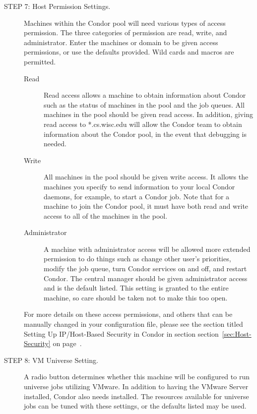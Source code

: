 \begin{description}
\item[STEP 7: Host Permission Settings.]
     Machines within the Condor pool will need various types of 
     access permission. 
     The three categories of permission are read, write, and administrator.
     Enter the machines or domain to be given access permissions,
     or use the defaults provided.
     Wild cards and macros are permitted.

     \begin{description}
     \item[Read]
     Read access allows a machine to obtain information about
     Condor such as the status of machines in the pool and the job queues.
     All machines in the pool should be given read access. 
     In addition, giving read access to *.cs.wisc.edu 
     will allow the Condor team to obtain information about
     the Condor pool, in the event that debugging is needed.
     \item[Write]
     All machines in the pool should be given write access. 
     It allows the machines you specify to send information to your
     local Condor daemons, for example, to start a Condor job.
     Note that for a machine to join the Condor pool, 
     it must have both read and write access to all of the machines in the pool.
     \item[Administrator]
     A machine with administrator access will be allowed more
     extended permission to do things such as
     change other user's priorities, modify the job queue,
     turn Condor services on and off, and restart Condor.
     The central manager should be given administrator access
     and is the default listed.
     This setting is granted to the entire machine, 
     so care should be taken not to make this too open.
     \end{description}

     For more details on these access permissions, and others that can be
     manually changed in your configuration file, please
     see the section titled Setting Up IP/Host-Based Security in Condor
     in section section~\ref{sec:Host-Security}
     on page~\pageref{sec:Host-Security}.

\item[STEP 8: VM Universe Setting.]
     A radio button determines whether 
     this machine will be configured to run  universe jobs 
     utilizing VMware.
     In addition to having the VMware Server installed, Condor also needs
      installed.
     The resources available for  universe jobs can be tuned 
     with these settings, or the defaults listed may be used.


\end{description}
